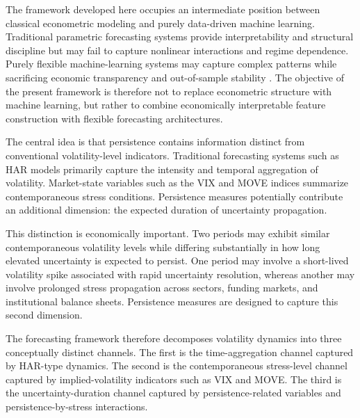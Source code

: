 \documentclass[unnumsec,webpdf,contemporary,large]{oup-authoring-template}%
\theoremstyle{thmstyleone}%
\theoremstyle{thmstyletwo}%
\theoremstyle{thmstylethree}%
\begin{document}
The framework developed here occupies an intermediate position between
classical econometric modeling and purely data-driven machine learning.
Traditional parametric forecasting systems provide interpretability and
structural discipline but may fail to capture nonlinear interactions and
regime dependence. Purely flexible machine-learning systems may capture
complex patterns while sacrificing economic transparency and out-of-sample
stability \citep{gu2020empirical}. The objective of the present framework
is therefore not to replace econometric structure with machine learning,
but rather to combine economically interpretable feature construction with
flexible forecasting architectures.

The central idea is that persistence contains information distinct from
conventional volatility-level indicators. Traditional forecasting systems
such as HAR models primarily capture the intensity and temporal aggregation
of volatility. Market-state variables such as the VIX and MOVE indices
summarize contemporaneous stress conditions. Persistence measures
potentially contribute an additional dimension: the expected duration of
uncertainty propagation.

This distinction is economically important. Two periods may exhibit similar
contemporaneous volatility levels while differing substantially in how long
elevated uncertainty is expected to persist. One period may involve a
short-lived volatility spike associated with rapid uncertainty resolution,
whereas another may involve prolonged stress propagation across sectors,
funding markets, and institutional balance sheets. Persistence measures are
designed to capture this second dimension.

The forecasting framework therefore decomposes volatility dynamics into
three conceptually distinct channels. The first is the time-aggregation
channel captured by HAR-type dynamics. The second is the contemporaneous
stress-level channel captured by implied-volatility indicators such as VIX
and MOVE. The third is the uncertainty-duration channel captured by
persistence-related variables and persistence-by-stress interactions.
\end{document}
